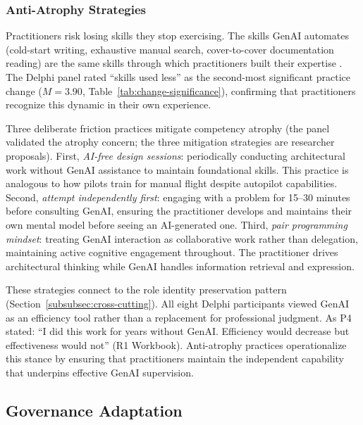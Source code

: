 \subsubsection{Anti-Atrophy Strategies}\label{subsubsec:anti-atrophy}

Practitioners risk losing skills they stop exercising. The skills GenAI
automates (cold-start writing, exhaustive manual search, cover-to-cover
documentation reading) are the same skills through which practitioners built
their expertise
\parencite{kabashkin_cognitive_atrophy_2025}. The Delphi panel rated ``skills
used less'' as the second-most significant practice change ($M = 3.90$,
Table~\ref{tab:change-significance}), confirming that practitioners recognize
this dynamic in their own experience.

Three deliberate friction practices mitigate competency atrophy (the panel
validated the atrophy concern; the three mitigation strategies are researcher
proposals). First,
\textit{AI-free design sessions}: periodically conducting architectural work
without GenAI assistance to maintain foundational skills. This practice is
analogous to how pilots train for manual flight despite autopilot capabilities.
Second, \textit{attempt independently first}: engaging with a problem for 15--30
minutes before consulting GenAI, ensuring the practitioner develops and maintains
their own mental model before seeing an AI-generated one. Third, \textit{pair
programming mindset}: treating GenAI interaction as collaborative work rather
than delegation, maintaining active cognitive engagement throughout. The
practitioner drives architectural thinking while GenAI handles information
retrieval and expression.

These strategies connect to the role identity preservation pattern
(Section~\ref{subsubsec:cross-cutting}). All eight Delphi participants viewed
GenAI as an efficiency tool rather than a replacement for professional judgment.
As P4 stated: ``I did this work for years without GenAI. Efficiency would
decrease but effectiveness would not'' (R1 Workbook). Anti-atrophy practices
operationalize this stance by ensuring that practitioners maintain the
independent capability that underpins effective GenAI supervision.

\subsection{Governance Adaptation}\label{subsec:governance-adaptation}

